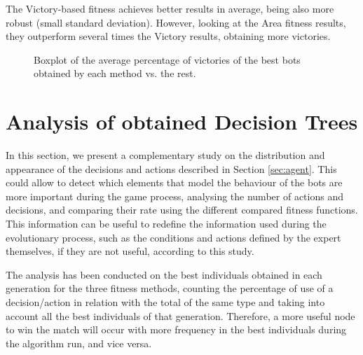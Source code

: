 \documentclass[preprint]{elsarticle}
\begin{document}
The Victory-based fitness achieves better results in average, being also more robust (small standard deviation). However, looking at the Area fitness results, they outperform several times the Victory results, obtaining more victories.


 \begin{figure}[ht]
 \begin{center}
 \end{center}
 \caption{Boxplot of the average percentage of victories of the best bots obtained by each method vs. the rest.}

 \label{figura:boxplotvictories}
 \end{figure}



\section{Analysis of obtained Decision Trees}
\label{sec:analysis_DT}

In this section, we present a complementary study on the distribution and appearance of the decisions and actions described in Section \ref{sec:agent}. This could allow to detect which elements that model the behaviour of the bots are more important during the game process, analysing the number of actions and decisions, and comparing their rate using the different compared fitness functions. This information can be useful to redefine the information used during the evolutionary process, such as the conditions and actions defined by the expert themselves, if they are not useful, according to this study. 

The analysis has been conducted on the best individuals obtained in
each generation for the three fitness methods, counting the percentage
of use of a decision/action in relation with the total of the same
type and taking into account all the best individuals of that
generation. Therefore, a more useful node to win the match will occur
with more frequency  in the best individuals during the algorithm run, and
vice versa. 
\end{document}
